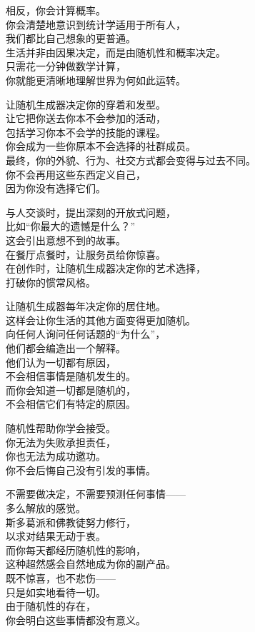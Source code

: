 \documentclass[
]{article}
\begin{document}
相反，你会计算概率。\\
你会清楚地意识到统计学适用于所有人，\\
我们都比自己想象的更普通。\\
生活并非由因果决定，而是由随机性和概率决定。\\
只需花一分钟做数学计算，\\
你就能更清晰地理解世界为何如此运转。

让随机生成器决定你的穿着和发型。\\
让它把你送去你本不会参加的活动，\\
包括学习你本不会学的技能的课程。\\
你会成为一些你原本不会选择的社群成员。\\
最终，你的外貌、行为、社交方式都会变得与过去不同。\\
你不会再用这些东西定义自己，\\
因为你没有选择它们。

与人交谈时，提出深刻的开放式问题，\\
比如``你最大的遗憾是什么？''\\
这会引出意想不到的故事。\\
在餐厅点餐时，让服务员给你惊喜。\\
在创作时，让随机生成器决定你的艺术选择，\\
打破你的惯常风格。

让随机生成器每年决定你的居住地。\\
这样会让你生活的其他方面变得更加随机。\\
向任何人询问任何话题的``为什么''，\\
他们都会编造出一个解释。\\
他们认为一切都有原因，\\
不会相信事情是随机发生的。\\
而你会知道一切都是随机的，\\
不会相信它们有特定的原因。

随机性帮助你学会接受。\\
你无法为失败承担责任，\\
你也无法为成功邀功。\\
你不会后悔自己没有引发的事情。

不需要做决定，不需要预测任何事情------\\
多么解放的感觉。\\
斯多葛派和佛教徒努力修行，\\
以求对结果无动于衷。\\
而你每天都经历随机性的影响，\\
这种超然感会自然地成为你的副产品。\\
既不惊喜，也不悲伤------\\
只是如实地看待一切。\\
由于随机性的存在，\\
你会明白这些事情都没有意义。
\end{document}
